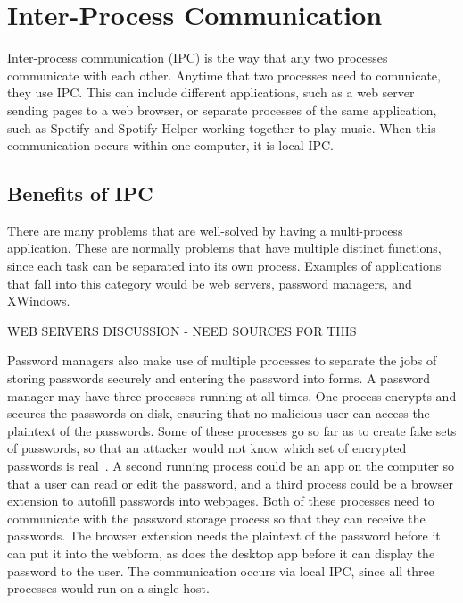 \chapter{Inter-Process Communication}
\label{sec:interProcessCommunication}

Inter-process communication (IPC) is the way that any two processes communicate with each other.  Anytime that two processes need to comunicate, they use IPC.  This can include different applications, such as a web server sending pages to a web browser, or separate processes of the same application, such as Spotify and Spotify Helper working together to play music.  When this communication occurs within one computer, it is local IPC.


\section{Benefits of IPC}
\label{sec:benefitsOfIPC}
There are many problems that are well-solved by having a multi-process application.  These are normally problems that have multiple distinct functions, since each task can be separated into its own process.  Examples of applications that fall into this category would be web servers, password managers, and XWindows.

WEB SERVERS DISCUSSION - NEED SOURCES FOR THIS

Password managers also make use of multiple processes to separate the jobs of storing passwords securely and entering the password into forms.  A password manager may have three processes running at all times.  One process encrypts and secures the passwords on disk, ensuring that no malicious user can access the plaintext of the passwords.  Some of these processes go so far as to create fake sets of passwords, so that an attacker would not know which set of encrypted passwords is real~\cite{bojinov2010kamouflage}.  A second running process could be an app on the computer so that a user can read or edit the password, and a third process could be a browser extension to autofill passwords into webpages.  Both of these processes need to communicate with the password storage process so that they can receive the passwords.  The browser extension needs the plaintext of the password before it can put it into the webform, as does the desktop app before it can display the password to the user.  The communication occurs via local IPC, since all three processes would run on a single host.

